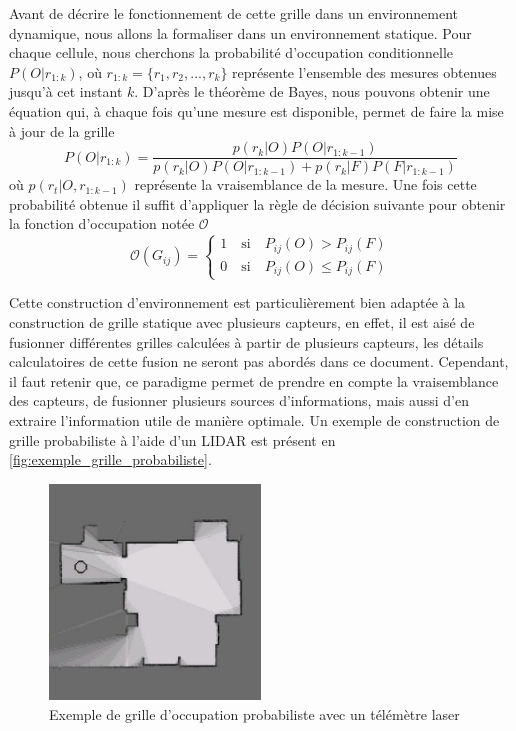 Avant de décrire le fonctionnement de cette grille dans un environnement dynamique, nous allons la formaliser dans un environnement statique. Pour chaque cellule, nous cherchons la probabilité d'occupation conditionnelle $P(O | r_{1:k})$, où $r_{1:k} = \{r_1, r_2, ..., r_k\}$ représente l'ensemble des mesures obtenues jusqu'à cet instant $k$. D'après le théorème de Bayes, nous pouvons obtenir une équation qui, à chaque fois qu'une mesure est disponible, permet de faire la mise à jour de la grille
\begin{equation}
    P(O|r_{1:k}) = \dfrac{p(r_k | O)  P(O|r_{1:k-1})}{p(r_k | O) P(O|r_{1:k-1}) + p(r_k | F) P(F|r_{1:k-1})}
\end{equation} 
 où $p(r_t|O, r_{1:k-1})$ représente la vraisemblance de la mesure. Une fois cette probabilité obtenue il suffit d'appliquer la règle de décision suivante pour obtenir la fonction d'occupation notée $\mathcal{O}$
\begin{equation} \mathcal{O}(G_{ij}) = \begin{cases} 1 \quad \text{si} \quad P_{ij}(O) > P_{ij}(F) \\ 0 \quad \text{si} \quad P_{ij}(O) \leq P_{ij}(F) \end{cases}\end{equation}

Cette construction d'environnement est particulièrement bien adaptée à la construction de grille statique avec plusieurs capteurs, en effet, il est aisé de fusionner différentes grilles calculées à partir de plusieurs capteurs, les détails calculatoires de cette fusion ne seront pas abordés dans ce document. Cependant, il faut retenir que, ce paradigme permet de prendre en compte la vraisemblance des capteurs, de fusionner plusieurs sources d'informations, mais aussi d'en extraire l'information utile de manière optimale. Un exemple de construction de grille probabiliste à l'aide d'un LIDAR est présent en \autoref{fig:exemple_grille_probabiliste}.

\begin{figure}[H]
    \centering
    \includegraphics[width=0.5\textwidth]{Rapport/images/ExempleGrilleOccupation.jpeg}
    \caption{Exemple de grille d'occupation probabiliste avec un télémètre laser}
    \label{fig:exemple_grille_probabiliste}
\end{figure}

